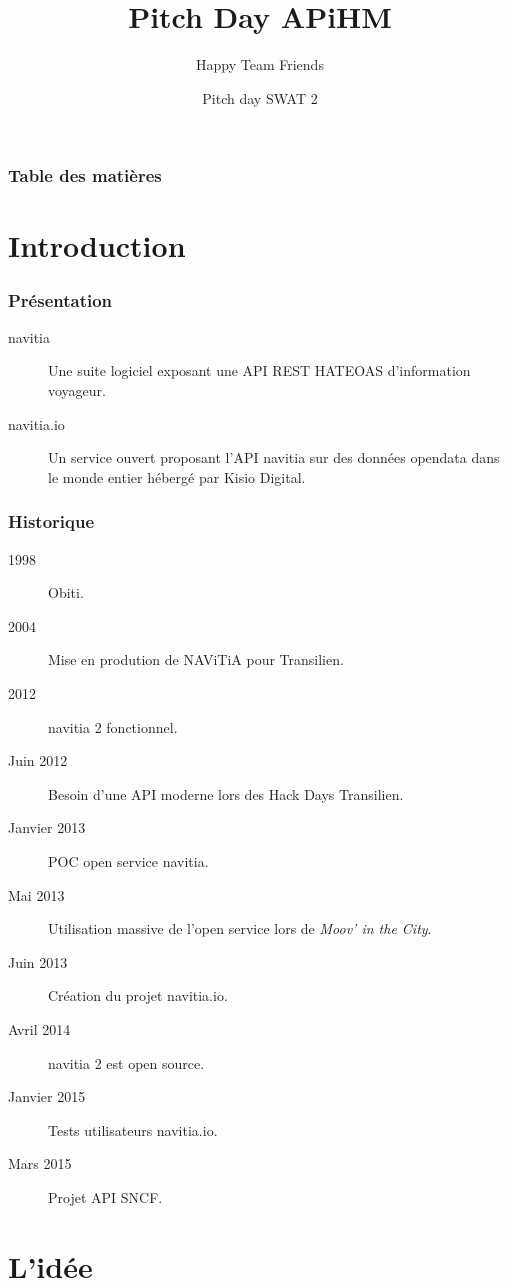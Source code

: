 \documentclass[table]{beamer}
\title{Pitch Day APiHM}
\author{Happy Team Friends}
\institute[Kisio Digital] %
{
  Kisio Digital\\
  20 rue Hector Malot\\
  75012 Paris, France}
\date{Pitch day SWAT 2}
\begin{document}
\begin{frame}
  \titlepage
\end{frame}

\begin{frame}%
  \frametitle{Table des matières}
  \tableofcontents[hideallsubsections]
\end{frame}

\section{Introduction}

\begin{frame}
  \frametitle{Présentation}

  \begin{description}
  \item[navitia] Une suite logiciel exposant une API REST HATEOAS d'information voyageur.
  \item[navitia.io] Un service ouvert proposant l'API navitia sur des
    données opendata dans le monde entier hébergé par Kisio Digital.
  \end{description}
\end{frame}

\begin{frame}
  \frametitle{Historique}

  \begin{description}
  \item[1998] Obiti.
  \item[2004] Mise en prodution de NAViTiA pour Transilien.
  \item[2012] navitia 2 fonctionnel.
  \item[Juin 2012] Besoin d'une API moderne lors des Hack Days Transilien.
  \item[Janvier 2013] POC open service navitia.
  \item[Mai 2013] Utilisation massive de l'open service lors de
    \emph{Moov' in the City}.
  \item[Juin 2013] Création du projet navitia.io.
  \item[Avril 2014] navitia 2 est open source.
  \item[Janvier 2015] Tests utilisateurs navitia.io.
  \item[Mars 2015] Projet API SNCF.
  \end{description}
\end{frame}

\section{L'idée}
\end{document}
